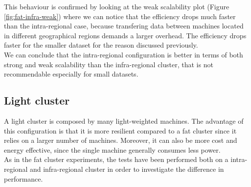 \documentclass[final,5p,times,twocolumn,authoryear]{elsarticle}
\begin{document}
This behaviour is confirmed by looking at the weak scalability plot (Figure \ref{fig:fat-infra-weak}) where we can notice that the efficiency drops much faster than the intra-regional case, because transfering data between machines located in different geographical regions demands a larger overhead. The efficiency drops faster for the smaller dataset for the reason discussed previously. \\
We can conclude that the intra-regional configuration is better in terms of both strong and weak scalability than the infra-regional cluster, that is not recommendable especially for small datasets.

\subsection{Light cluster}
A light cluster is composed by many light-weighted machines. The advantage of this configuration is that it is more resilient compared to a fat cluster since it relies on a larger number of machines. Moreover, it can also be more cost and energy effective, since the single machine generally consumes less power. \\
As in the fat cluster experiments, the tests have been performed both on a intra-regional and infra-regional cluster in order to investigate the difference in performance. 
\end{document}
